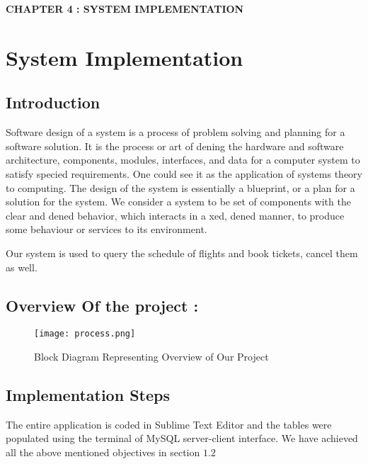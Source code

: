 \documentclass[hidelinks=true]{article}
\begin{document}
\pagebreak
\begin{center}
\vspace*{\fill}
\LARGE{\textbf{CHAPTER 4 : SYSTEM IMPLEMENTATION}}
\vspace*{\fill}
\end{center}

\pagebreak
\large
\section{System Implementation}
\subsection{Introduction}

Software design of a system is a process of problem solving and planning for a software
solution. It is the process or art of dening the hardware and software architecture,
components, modules, interfaces, and data for a computer system to satisfy specied
requirements. One could see it as the application of systems theory to computing. The
design of the system is essentially a blueprint, or a plan for a solution for the system.
We consider a system to be set of components with the clear and dened behavior,
which interacts in a xed, dened manner, to produce some behaviour or services to its
environment.
\vspace{10pt}

Our system is used to query the schedule of flights and book tickets, cancel them as well.
\subsection{Overview Of the project : }
\begin{center}
\begin{figure}[ht]
\texttt{[image: process.png]}
\caption{Block Diagram Representing Overview of Our Project}
\end{figure}
\end{center}
\pagebreak
\large
\subsection{Implementation Steps}
The entire application is coded in Sublime Text Editor and the tables were populated using the terminal of MySQL server-client interface. We have achieved all the above mentioned objectives in section $1.2$
\end{document}

